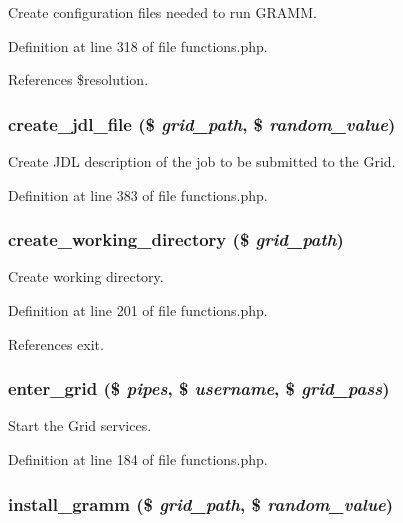 Create configuration files needed to run GRAMM. 



Definition at line 318 of file functions.php.

References \$resolution.
\subsubsection{\setlength{\rightskip}{0pt plus 5cm}create\_\-jdl\_\-file (\$ {\em grid\_\-path}, \$ {\em random\_\-value})}\label{functions_8php_a9}


Create JDL description of the job to be submitted to the Grid. 



Definition at line 383 of file functions.php.
\subsubsection{\setlength{\rightskip}{0pt plus 5cm}create\_\-working\_\-directory (\$ {\em grid\_\-path})}\label{functions_8php_a4}


Create working directory. 



Definition at line 201 of file functions.php.

References exit.
\subsubsection{\setlength{\rightskip}{0pt plus 5cm}enter\_\-grid (\$ {\em pipes}, \$ {\em username}, \$ {\em grid\_\-pass})}\label{functions_8php_a3}


Start the Grid services. 



Definition at line 184 of file functions.php.
\subsubsection{\setlength{\rightskip}{0pt plus 5cm}install\_\-gramm (\$ {\em grid\_\-path}, \$ {\em random\_\-value})}\label{functions_8php_a2}



